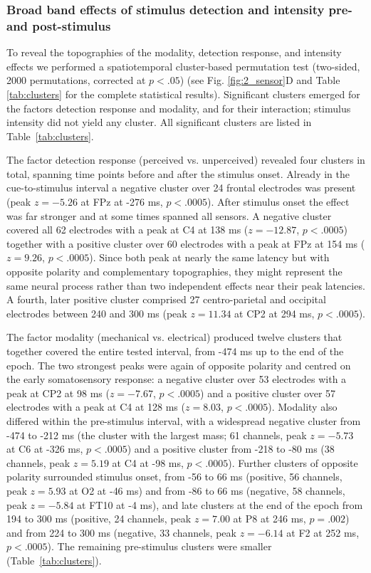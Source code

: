 \documentclass[11pt,a4paper,onecolumn]{article}
\begin{document}
\vspace{-7pt}

\subsubsection*{Broad band effects of stimulus detection and intensity pre- and post-stimulus}
\vspace{-7pt}

To reveal the topographies of the modality, detection response, and intensity effects we performed a spatiotemporal cluster-based permutation test (two-sided, 2000 permutations, corrected at $p < .05$) (see Fig. \ref{fig:2_sensor}D and Table \ref{tab:clusters} for the complete statistical results).
Significant clusters emerged for the factors detection response and modality, and for their interaction; stimulus intensity did not yield any cluster. All significant clusters are listed in Table~\ref{tab:clusters}.

The factor detection response (perceived vs. unperceived) revealed four clusters in total, spanning time points before and after the stimulus onset. Already in the cue-to-stimulus interval a negative cluster over 24 frontal electrodes was present (peak $z = -5.26$ at FPz at -276 ms, $p < .0005$). After stimulus onset the effect was far stronger and at some times spanned all sensors. A negative cluster covered all 62 electrodes with a peak at C4 at 138 ms ($z = -12.87$, $p < .0005$) together with a positive cluster over 60 electrodes with a peak at FPz at 154 ms ($z = 9.26$, $p < .0005$). Since both peak at nearly the same latency but with opposite polarity and complementary topographies, they might represent the same neural process rather than two independent effects near their peak latencies. A fourth, later positive cluster comprised 27 centro-parietal and occipital electrodes between 240 and 300 ms (peak $z = 11.34$ at CP2 at 294 ms, $p < .0005$).

The factor modality (mechanical vs. electrical) produced twelve clusters that together covered the entire tested interval, from -474 ms up to the end of the epoch. The two strongest peaks were again of opposite polarity and centred on the early somatosensory response: a negative cluster over 53 electrodes with a peak at CP2 at 98 ms ($z = -7.67$, $p < .0005$) and a positive cluster over 57 electrodes with a peak at C4 at 128 ms ($z = 8.03$, $p < .0005$). Modality also differed within the pre-stimulus interval, with a widespread negative cluster from -474 to -212 ms (the cluster with the largest mass; 61 channels, peak $z = -5.73$ at C6 at -326 ms, $p < .0005$) and a positive cluster from -218 to -80 ms (38 channels, peak $z = 5.19$ at C4 at -98 ms, $p < .0005$). Further clusters of opposite polarity surrounded stimulus onset, from -56 to 66 ms (positive, 56 channels, peak $z = 5.93$ at O2 at -46 ms) and from -86 to 66 ms (negative, 58 channels, peak $z = -5.84$ at FT10 at -4 ms), and late clusters at the end of the epoch from 194 to 300 ms (positive, 24 channels, peak $z = 7.00$ at P8 at 246 ms, $p = .002$) and from 224 to 300 ms (negative, 33 channels, peak $z = -6.14$ at F2 at 252 ms, $p < .0005$). The remaining pre-stimulus clusters were smaller (Table~\ref{tab:clusters}).
\end{document}
